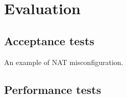 \chapter{Evaluation}\label{chapter:eval}

\section{Acceptance tests}
\begin{listing}[H]
  \caption{An example of NAT misconfiguration.}
  \label{lst:example}
\end{listing}

\section{Performance tests}
